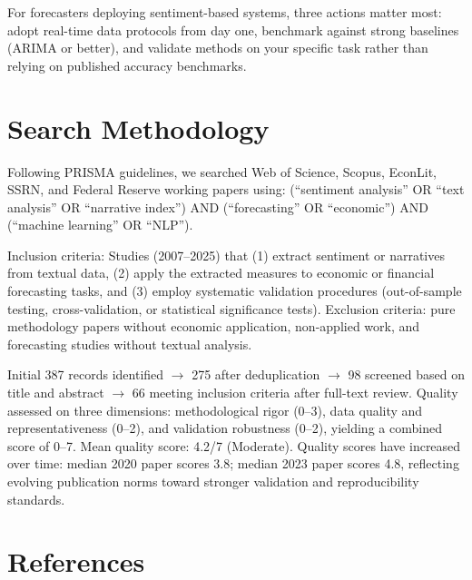 \documentclass[11pt]{article}
\begin{document}
For forecasters deploying sentiment-based systems, three actions matter most: adopt real-time data protocols from day one, benchmark against strong baselines (ARIMA or better), and validate methods on your specific task rather than relying on published accuracy benchmarks.

\appendix

\section{Search Methodology}

Following PRISMA guidelines, we searched Web of Science, Scopus, EconLit, SSRN, and Federal Reserve working papers using: (``sentiment analysis'' OR ``text analysis'' OR ``narrative index'') AND (``forecasting'' OR ``economic'') AND (``machine learning'' OR ``NLP'').

Inclusion criteria: Studies (2007--2025) that (1) extract sentiment or narratives from textual data, (2) apply the extracted measures to economic or financial forecasting tasks, and (3) employ systematic validation procedures (out-of-sample testing, cross-validation, or statistical significance tests). Exclusion criteria: pure methodology papers without economic application, non-applied work, and forecasting studies without textual analysis.

Initial 387 records identified $\to$ 275 after deduplication $\to$ 98 screened based on title and abstract $\to$ 66 meeting inclusion criteria after full-text review. Quality assessed on three dimensions: methodological rigor (0--3), data quality and representativeness (0--2), and validation robustness (0--2), yielding a combined score of 0--7. Mean quality score: 4.2/7 (Moderate). Quality scores have increased over time: median 2020 paper scores 3.8; median 2023 paper scores 4.8, reflecting evolving publication norms toward stronger validation and reproducibility standards.

\newpage
\section*{References}
\end{document}
